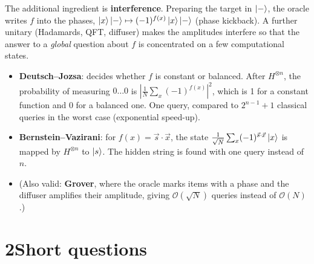 \documentclass[11pt,a4paper]{article}
\begin{document}
The additional ingredient is \textbf{interference}. Preparing the target in $\ket{-}$, the oracle
writes $f$ into the phases, $\ket{x}\ket{-}\mapsto(-1)^{f(x)}\ket{x}\ket{-}$ (phase kickback). A further
unitary (Hadamards, QFT, diffuser) makes the amplitudes interfere so that the answer to a
\emph{global} question about $f$ is concentrated on a few computational states.
\begin{itemize}
\item \textbf{Deutsch--Jozsa}: decides whether $f$ is constant or balanced. After
$H^{\otimes n}$, the probability of measuring $0\dots0$ is $|\frac1N\sum_x(-1)^{f(x)}|^2$, which is 1
for a constant function and 0 for a balanced one. One query, compared to $2^{n-1}+1$ classical
queries in the worst case (exponential speed-up).
\item \textbf{Bernstein--Vazirani}: for $f(x)=\vec s\cdot\vec x$, the state
$\frac1{\sqrt N}\sum_x(-1)^{\vec s\cdot\vec x}\ket{x}$ is mapped by $H^{\otimes n}$ to $\ket{s}$. The
hidden string is found with one query instead of $n$.
\item (Also valid: \textbf{Grover}, where the oracle marks items with a phase and the diffuser
amplifies their amplitude, giving $\mathcal{O}(\sqrt N)$ queries instead of $\mathcal{O}(N)$.)
\end{itemize}

\section*{2\quad Short questions}
\end{document}

